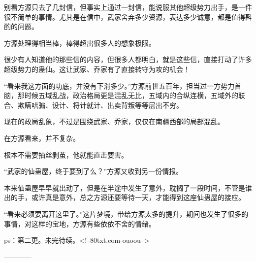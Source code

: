 \begin{this_body}
别看方源只去了几封信，但事实上通过一封信，能说服其他超级势力出手，是一件很不简单的事情。尤其是在信中，武家舍弃多少资源，表达多少诚意，都是值得斟酌的问题。

方源处理得相当棒，棒得超出很多人的想象极限。

很少有人知道他的那些信的内容，但很多人都明白，就是这些信，直接打动了许多超级势力的蛊仙。这让武家、乔家有了直接转守为攻的机会！

“看来我这方面的功底，并没有下滑多少。”方源前世五百年，担当过一方势力首脑，那时候五域乱战，政治格局更是混乱无比，五域内的合纵连横，五域外的联合、欺瞒哄骗、设计、将计就计、出卖背叛等等层出不穷。

现在的政局乱象，不过是围绕武家、乔家，仅仅在南疆西部的局部混乱。

在方源看来，并不复杂。

根本不需要抽丝剥茧，他就能直击要害。

“武家的仙蛊屋，终于要到了么？”方源又收到另一份情报。

本来仙蛊屋早早就出动了，但是在半途中发生了意外，耽搁了一段时间，不管是谁出的手，或许真是意外，总之方源还要等待一天，才能得到这座仙蛊屋的接应。

“看来必须要离开这里了。”这片梦境，带给方源太多的提升，期间也发生了很多的事情，对这样的宝地，方源有些依依不舍的情绪。

ps：第二更。未完待续。<!--80txt.com-ouoou-->

------------

\end{this_body}

